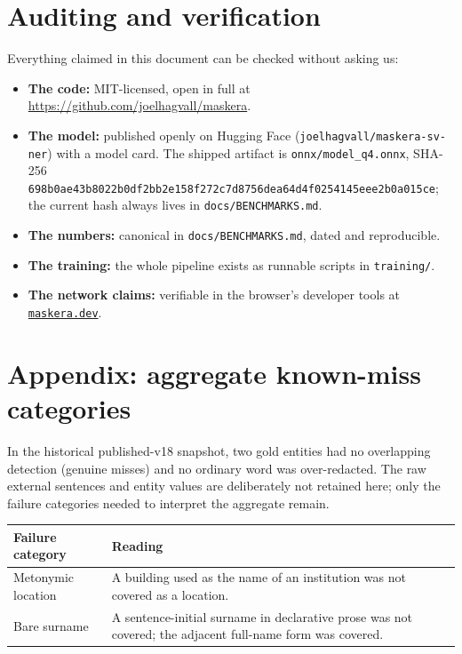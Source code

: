 \documentclass[10pt,a4paper]{article}
\newcommand{\pkg}[1]{\texttt{#1}}
\begin{document}
\section{Auditing and verification}

Everything claimed in this document can be checked without asking us:

\begin{itemize}
  \item \textbf{The code:} MIT-licensed, open in full at
        \url{https://github.com/joelhagvall/maskera}.
  \item \textbf{The model:} published openly on Hugging Face
        (\pkg{joelhagvall/maskera-sv-ner}) with a model card. The shipped
        artifact is \pkg{onnx/model\_q4.onnx}, SHA-256\\
        {\footnotesize\texttt{698b0ae43b8022b0df2bb2e158f272c7d8756dea64d4f0254145eee2b0a015ce}};\\
        the current hash always lives in \pkg{docs/BENCHMARKS.md}.
  \item \textbf{The numbers:} canonical in \pkg{docs/BENCHMARKS.md},
        dated and reproducible.
  \item \textbf{The training:} the whole pipeline exists as runnable scripts
        in \pkg{training/}.
  \item \textbf{The network claims:} verifiable in the browser's developer
        tools at \href{https://maskera.dev}{\pkg{maskera.dev}}.
\end{itemize}

\section*{Appendix: aggregate known-miss categories}

In the historical published-v18 snapshot, two gold entities had no overlapping
detection (genuine misses) and no ordinary word was over-redacted. The raw
external sentences and entity values are deliberately not retained here;
only the failure categories needed to interpret the aggregate remain.

\begin{table}[H]
\centering
\begin{tabular}{p{52mm}p{84mm}}
\toprule
Failure category & Reading \\
\midrule
Metonymic location & A building used as the name of an institution was not
covered as a location. \\
Bare surname & A sentence-initial surname in declarative prose was not covered;
the adjacent full-name form was covered. \\
\bottomrule
\end{tabular}
\end{table}
\end{document}
